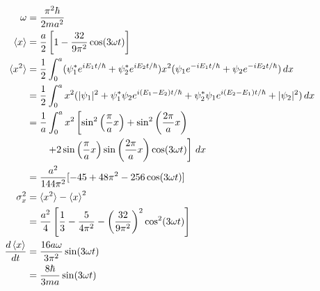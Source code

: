 \documentclass{article}
\begin{document}
\begin{align*}
  \omega                   & = \frac{\pi^2 \hbar}{2 m a^2}                                                                                                                              \\
  \braket{x}               & = \frac{a}{2} \left[ 1 - \frac{32}{9 \pi^2} \cos (3 \omega t) \right]                                                                                      \\
  \braket{x^2}             & = \frac{1}{2} \int_0^a (\psi_1^* e^{i E_1 t / \hbar} + \psi_2^* e^{i E_2 t / \hbar}) x^2 (\psi_1 e^{-i E_1 t / \hbar} + \psi_2 e^{-i E_2 t / \hbar}) \,d x \\
                           & = \frac{1}{2} \int_0^a x^2 (|\psi_1|^2 + \psi_1^* \psi_2 e^{i (E_1 - E_2) t / \hbar} + \psi_2^* \psi_1 e^{i (E_2 - E_1) t / \hbar} + |\psi_2|^2) \,d x     \\
                           & = \frac{1}{a} \int_0^a x^2 \left[ \sin^2 \left( \frac{\pi}{a} x \right) + \sin^2 \left( \frac{2 \pi}{a} x \right) \right.                                  \\
                           & \qquad \left. + 2 \sin \left( \frac{\pi}{a} x \right) \sin \left( \frac{2 \pi}{a} x \right) \cos (3 \omega t) \right] \,d x                                \\
                           & = \frac{a^2}{144 \pi^2} [-45 + 48 \pi^2 - 256 \cos (3 \omega t)]                                                                                           \\
  \sigma_x^2               & = \braket{x^2} - \braket{x}^2                                                                                                                              \\
                           & = \frac{a^2}{4} \left[ \frac{1}{3} - \frac{5}{4 \pi^2} - \left( \frac{32}{9 \pi^2} \right)^2 \cos^2 (3 \omega t) \right]                                   \\
  \frac{d \braket{x}}{d t} & = \frac{16 a \omega}{3 \pi^2} \sin (3 \omega t)                                                                                                            \\
                           & = \frac{8 \hbar}{3 m a} \sin (3 \omega t)
\end{align*}
\end{document}
